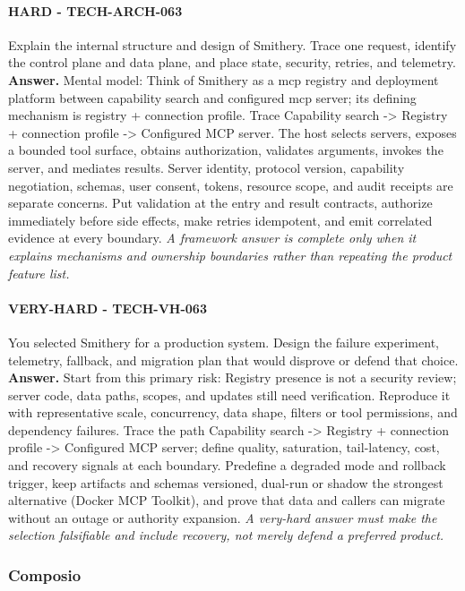 \paragraph{HARD - TECH-ARCH-063} Explain the internal structure and design of Smithery. Trace one request, identify the control plane and data plane, and place state, security, retries, and telemetry.
\textbf{Answer.} Mental model: Think of Smithery as a mcp registry and deployment platform between capability search and configured mcp server; its defining mechanism is registry + connection profile. Trace Capability search -> Registry + connection profile -> Configured MCP server. The host selects servers, exposes a bounded tool surface, obtains authorization, validates arguments, invokes the server, and mediates results. Server identity, protocol version, capability negotiation, schemas, user consent, tokens, resource scope, and audit receipts are separate concerns. Put validation at the entry and result contracts, authorize immediately before side effects, make retries idempotent, and emit correlated evidence at every boundary.
\textit{A framework answer is complete only when it explains mechanisms and ownership boundaries rather than repeating the product feature list.}
\paragraph{VERY-HARD - TECH-VH-063} You selected Smithery for a production system. Design the failure experiment, telemetry, fallback, and migration plan that would disprove or defend that choice.
\textbf{Answer.} Start from this primary risk: Registry presence is not a security review; server code, data paths, scopes, and updates still need verification. Reproduce it with representative scale, concurrency, data shape, filters or tool permissions, and dependency failures. Trace the path Capability search -> Registry + connection profile -> Configured MCP server; define quality, saturation, tail-latency, cost, and recovery signals at each boundary. Predefine a degraded mode and rollback trigger, keep artifacts and schemas versioned, dual-run or shadow the strongest alternative (Docker MCP Toolkit), and prove that data and callers can migrate without an outage or authority expansion.
\textit{A very-hard answer must make the selection falsifiable and include recovery, not merely defend a preferred product.}
\subsubsection*{Composio}
